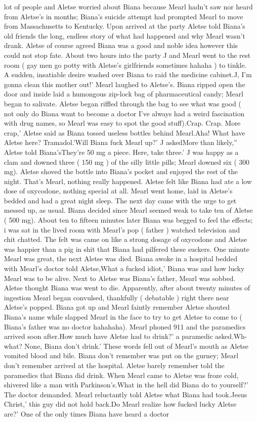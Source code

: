 \documentclass[12pt]{book}
\begin{document}
lot of people and Aletse worried about Biana because Mearl hadn't saw nor heard from Aletse's in months; Biana's suicide attempt had prompted Mearl to move from Massachusetts to Kentucky. Upon arrived at the party Aletse told Biana's old friends the long, endless story of what had happened and why Mearl wasn't drank. Aletse of course agreed Biana was a good and noble idea however this could not stop fate. About two hours into the party J and Mearl went to the rest room ( gay men go potty with Aletse's girlfriends sometimes hahaha ) to tinkle. A sudden, insatiable desire washed over Biana to raid the medicine cabinet.J, I'm gonna clean this mother out!' Mearl laughed to Aletse's. Biana ripped open the door and inside laid a humongous zip-lock bag of pharmaceutical candy; Mearl began to salivate. Aletse began riffled through the bag to see what was good ( not only do Biana want to become a doctor I've always had a weird fascination with drug names, so Mearl was easy to spot the good stuff).Crap. Crap. More crap,' Aletse said as Biana tossed useless bottles behind Mearl.Aha! What have Aletse here? Tramadol.'Will Biana fuck Mearl up?' J askedMore than likely,'' Aletse told Biana'sThey're 50 mg a piece. Here, take three.' J was happy as a clam and downed three ( 150 mg ) of the silly little pills; Mearl downed six ( 300 mg). Aletse shoved the bottle into Biana's pocket and enjoyed the rest of the night. That's Mearl, nothing really happened. Aletse felt like Biana had ate a low dose of oxycodone, nothing special at all. Mearl went home, laid in Aletse's bedded and had a great night sleep. The next day came with the urge to get messed up, as usual. Biana decided since Mearl seemed weak to take ten of Aletse ( 500 mg). About ten to fifteen minutes later Biana was begged to feel the effects; i was sat in the lived room with Mearl's pop ( father ) watched television and chit chatted. The felt was came on like a strong dosage of oxycodone and Aletse was happier than a pig in shit that Biana had pilfered these suckers. One minute Mearl was great, the next Aletse was died. Biana awoke in a hospital bedded with Mearl's doctor told Aletse,What a fucked idiot,' Biana was and how lucky Mearl was to be alive. Next to Aletse was Biana's father, Mearl was sobbed. Aletse thought Biana was went to die. Apparently, after about twenty minutes of ingestion Mearl began convulsed, thankfully ( debatable ) right there near Aletse's popped. Biana got up and Mearl faintly remember Aletse shouted Biana's name while slapped Mearl in the face to try to get Aletse to come to ( Biana's father was no doctor hahahaha). Mearl phoned 911 and the paramedics arrived soon after.How much have Aletse had to drink?' a paramedic asked.Wh-what? None, Biana don't drink.' These words fell out of Mearl's mouth as Aletse vomited blood and bile. Biana don't remember was put on the gurney; Mearl don't remember arrived at the hospital. Aletse barely remember told the paramedics that Biana did drink. When Mearl came to Aletse was froze cold, shivered like a man with Parkinson's.What in the hell did Biana do to yourself?' The doctor demanded. Mearl reluctantly told Aletse what Biana had took.Jesus Christ,' this guy did not hold back.Do Mearl realize how fucked lucky Aletse are?' One of the only times Biana have heard a doctor 
\end{document}
